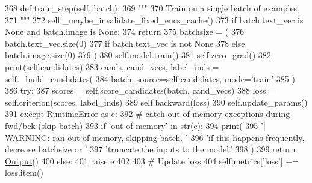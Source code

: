 \begin{DoxyCode}
368     \textcolor{keyword}{def }train\_step(self, batch):
369         \textcolor{stringliteral}{"""}
370 \textcolor{stringliteral}{        Train on a single batch of examples.}
371 \textcolor{stringliteral}{        """}
372         self.\_maybe\_invalidate\_fixed\_encs\_cache()
373         \textcolor{keywordflow}{if} batch.text\_vec \textcolor{keywordflow}{is} \textcolor{keywordtype}{None} \textcolor{keywordflow}{and} batch.image \textcolor{keywordflow}{is} \textcolor{keywordtype}{None}:
374             \textcolor{keywordflow}{return}
375         batchsize = (
376             batch.text\_vec.size(0)
377             \textcolor{keywordflow}{if} batch.text\_vec \textcolor{keywordflow}{is} \textcolor{keywordflow}{not} \textcolor{keywordtype}{None}
378             \textcolor{keywordflow}{else} batch.image.size(0)
379         )
380         self.model.\hyperlink{namespaceprojects_1_1mastering__the__dungeon_1_1mturk_1_1tasks_1_1MTD_1_1run_a36a5f4f6f9df0611a6818610518d2cf0}{train}()
381         self.zero\_grad()
382         print(self.candidates)
383         cands, cand\_vecs, label\_inds = self.\_build\_candidates(
384             batch, source=self.candidates, mode=\textcolor{stringliteral}{'train'}
385         )
386         \textcolor{keywordflow}{try}:
387             scores = self.score\_candidates(batch, cand\_vecs)
388             loss = self.criterion(scores, label\_inds)
389             self.backward(loss)
390             self.update\_params()
391         \textcolor{keywordflow}{except} RuntimeError \textcolor{keyword}{as} e:
392             \textcolor{comment}{# catch out of memory exceptions during fwd/bck (skip batch)}
393             \textcolor{keywordflow}{if} \textcolor{stringliteral}{'out of memory'} \textcolor{keywordflow}{in} \hyperlink{namespacegenerate__task__READMEs_a5b88452ffb87b78c8c85ececebafc09f}{str}(e):
394                 print(
395                     \textcolor{stringliteral}{'| WARNING: ran out of memory, skipping batch. '}
396                     \textcolor{stringliteral}{'if this happens frequently, decrease batchsize or '}
397                     \textcolor{stringliteral}{'truncate the inputs to the model.'}
398                 )
399                 \textcolor{keywordflow}{return} \hyperlink{namespaceparlai_1_1agents_1_1legacy__agents_1_1seq2seq_1_1torch__agent__v1_a2689006ea97d09413fb242f984bd8016}{Output}()
400             \textcolor{keywordflow}{else}:
401                 \textcolor{keywordflow}{raise} e
402 
403         \textcolor{comment}{# Update loss}
404         self.metrics[\textcolor{stringliteral}{'loss'}] += loss.item()

\end{DoxyCode}

